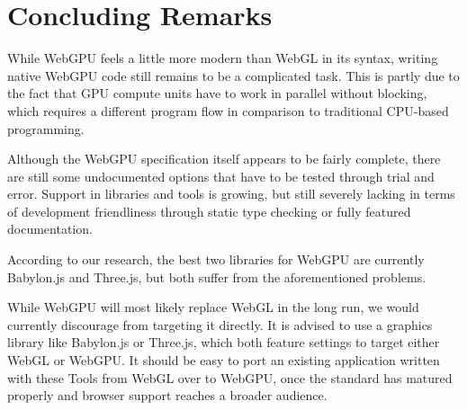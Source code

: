 %
%
% 
% 

\chapter{Concluding Remarks}


While WebGPU feels a little more modern than WebGL in its syntax, writing native WebGPU code
still remains to be a complicated task. This is partly due to the fact that GPU compute units
have to work in parallel without blocking, which requires a different program flow in
comparison to traditional CPU-based programming.

Although the WebGPU specification itself appears to be fairly complete, there are still some
undocumented options that have to be tested through trial and error.
Support in libraries and tools is growing, but still severely lacking in terms of development
friendliness through static type checking or fully featured documentation.

According to our research, the best two libraries for WebGPU are currently Babylon.js and
Three.js, but both suffer from the aforementioned problems.

While WebGPU will most likely replace WebGL in the long run, we would currently discourage from
targeting it directly. It is advised to use a graphics library like Babylon.js or Three.js,
which both feature settings to target either WebGL or WebGPU.
It should be easy to port an existing application written with these Tools from WebGL over to
WebGPU, once the standard has matured properly and browser support reaches a broader audience.
